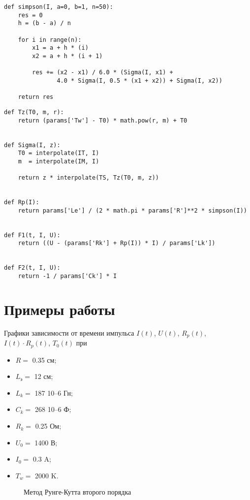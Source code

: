 \begin{lstlisting}[caption={Метод Симпосона},label={lst:simpson}]
def simpson(I, a=0, b=1, n=50):
    res = 0
    h = (b - a) / n

    for i in range(n):
        x1 = a + h * (i)
        x2 = a + h * (i + 1)

        res += (x2 - x1) / 6.0 * (Sigma(I, x1) +
               4.0 * Sigma(I, 0.5 * (x1 + x2)) + Sigma(I, x2))

    return res
\end{lstlisting}
\begin{lstlisting}[caption={Вычисление параметров},label={lst:params}]
def Tz(T0, m, r):
    return (params['Tw'] - T0) * math.pow(r, m) + T0


def Sigma(I, z):
    T0 = interpolate(IT, I)
    m  = interpolate(IM, I)

    return z * interpolate(TS, Tz(T0, m, z))


def Rp(I):
    return params['Le'] / (2 * math.pi * params['R']**2 * simpson(I))


def F1(t, I, U):
    return ((U - (params['Rk'] + Rp(I)) * I) / params['Lk'])


def F2(t, I, U):
    return -1 / params['Ck'] * I
\end{lstlisting}

\section{Примеры работы}
Графики зависимости от времени импульса
$I(t)$, $U(t)$, $R_p(t)$, $I(t) \cdot R_p(t)$, $T_0(t)$
при
\begin{itemize}
    \item $R   =$ 0.35 см;
    \item $L_{\text{э}}  =$ 12 см;
    \item $L_k  =$ 187 10--6 Гн;
    \item $C_k  =$ 268 10--6 Ф;
    \item $R_k  =$ 0.25 Ом;
    \item $U_0 =$ 1400 В;
    \item $I_0  =$ 0.3 A;
    \item $T_w  =$ 2000 K.
\end{itemize}

\begin{figure}[H]
    \caption{Метод Рунге-Кутта второго порядка}\label{img:plot01}
    
\end{figure}

